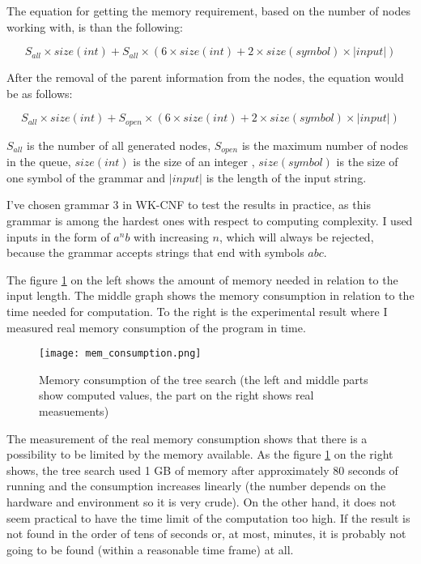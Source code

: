 The equation for getting the memory requirement, based on the number of nodes working with, is than the following:

$$S_{all} \times size(int) + S_{all} \times (6 \times size(int) + 2 \times size(symbol) \times |input|)$$

After the removal of the parent information from the nodes, the equation would be as follows:

$$S_{all} \times size(int) + S_{open} \times (6 \times size(int) + 2 \times size(symbol) \times |input|)$$

$S_{all}$ is the number of all generated nodes, $S_{open}$ is the maximum number of nodes in the queue, $size(int)$ is the size of an integer , $size(symbol)$ is the size of one symbol of the grammar and $|input|$ is the length of the input string.

I've chosen grammar 3 in WK-CNF to test the results in practice, as this grammar is among the hardest ones with respect to computing complexity. I used inputs in the form of $a^nb$ with increasing $n$, which will always be rejected, because the grammar accepts strings that end with symbols $abc$.

The figure \ref{fig:mem_consumption} on the left shows the amount of memory needed in relation to the input length. The middle graph shows the memory consumption in relation to the time needed for computation. To the right is the experimental result where I measured real memory consumption of the program in time.

\begin{figure}[h!]
  \texttt{[image: mem\_consumption.png]}
  \caption{Memory consumption of the tree search (the left and middle parts show computed values, the part on the right shows real measuements)}
  \label{fig:mem_consumption}
\end{figure}

The measurement of the real memory consumption shows that there is a possibility to be limited by the memory available. As the figure \ref{fig:mem_consumption} on the right shows, the tree search used 1 GB of memory after approximately 80 seconds of running and the consumption increases linearly (the number depends on the hardware and environment so it is very crude). On the other hand, it does not seem practical to have the time limit of the computation too high. If the result is not found in the order of tens of seconds or, at most, minutes, it is probably not going to be found (within a reasonable time frame) at all.

